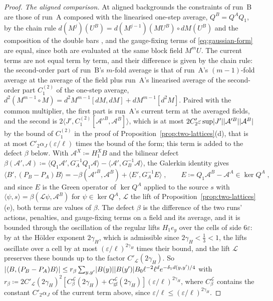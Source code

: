 \documentclass[11pt]{preprint}
\DeclarePairedDelimiter{\abs}{\lvert}{\rvert}
\numberwithin{equation}{section}
\theoremstyle{definition}
\theoremstyle{remark}
\theoremstyle{plain}
\begin{document}
\begin{proof}
\emph{The aligned comparison.} At aligned backgrounds the constraints of run~B are those of run~A composed with the linearised one-step average, $Q^B = Q^AQ_1$, by the chain rule $d(M^{j})(U^B) = d(M^{j-1})(MU^B) \circ dM(U^B)$ and the composition of the double bars \cite[(90)--(91)]{BalabanAVG}, and the gauge-fixing terms of \eqref{eq:gaussian-form} are equal, since both are evaluated at the same block field $M^mU$. The current terms are not equal term by term, and their difference is given by the chain rule: the second-order part of run~B's $m$-fold average is that of run~A's $(m - 1)$-fold average at the average of the field plus run~A's linearised average of the second-order part $C^{(2)}_1$ of the one-step average, $d^2(M^{m-1} \circ M) = d^2M^{m-1}[dM, dM] + dM^{m-1}[d^2M]$. Paired with the common multiplier, the first part is run~A's current term at the averaged fields, and the second is $2\langle J', C^{(2)}_1[\mathcal A'^B, \mathcal A^B]\rangle$, which is at most $2C'_2\varepsilon\sup\abs{J'}\abs{\mathcal A'^B}\abs{\mathcal A^B}$ by the bound of $C^{(2)}_1$ in the proof of Proposition~\ref{prop:two-lattices}(d), that is at most $C'_2\alpha_J(\varepsilon/\ell)$ times the bound of the form; this term is added to the defect $\beta$ below. With $\mathcal A^X \coloneqq H^X_1B$ and the bilinear defect $\beta(\mathcal A', \mathcal A) \coloneqq \langle Q_1\mathcal A', G_A^{-1}Q_1\mathcal A\rangle - \langle\mathcal A', G_B^{-1}\mathcal A\rangle$, the Galerkin identity gives
\begin{equation}\label{eq:penalty-difference}
    \langle B', (P_B - P_A)B\rangle = -\beta(\mathcal A'^B, \mathcal A^B) + \langle E', G_A^{-1}E\rangle\;,
    \qquad
    E \coloneqq Q_1\mathcal A^B - \mathcal A^A \in \ker Q^A\;,
\end{equation}
and since $E$ is the Green operator of $\ker Q^A$ applied to the source $s$ with $\langle\psi, s\rangle = \beta(\mathcal L\psi, \mathcal A^B)$ for $\psi \in \ker Q^A$, $\mathcal L$ the lift of Proposition~\ref{prop:two-lattices}(e), both terms are values of $\beta$. The defect $\beta$ is the difference of the two runs' actions, penalties, and gauge-fixing terms on a field and its average, and it is bounded through the oscillation of the regular lifts $H_1e_y$ over the cells of side $6\varepsilon$: by \cite[Theorem~3.12, (3.133), pp.~422--423]{BalabanPBG} at the H\"older exponent $2\gamma_H$, which is admissible since $2\gamma_H < \frac13 < 1$, the lifts oscillate over a cell by at most $(\varepsilon/\ell)^{2\gamma_H}$ times their bound, and the lift $\mathcal L$ preserves these bounds up to the factor $C'_{\mathcal L}(2\gamma_H)$. So $\abs{\langle B, (P_B - P_A)B\rangle} \leq r_\beta\sum_{y,y'}\abs{B(y)}\abs{B(y')}B_0\ell^{-2}\ell^de^{-\delta_1d(y,y')/4}$ with $r_\beta \coloneqq 2C'_{\mathcal L}(2\gamma_H)^2[C^{\mathcal L}_\beta(2\gamma_H) + C^{\mathcal L}_{\mathrm{gf}}(2\gamma_H)](\varepsilon/\ell)^{2\gamma_H}$, where $C^{\mathcal L}_\beta$ contains the constant $C'_2\alpha_J$ of the current term above, since $\varepsilon/\ell \leq (\varepsilon/\ell)^{2\gamma_H}$.


\end{proof}
\end{document}
